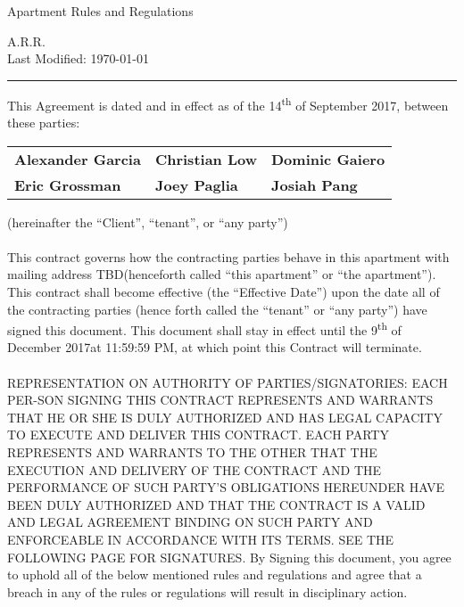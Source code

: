 \documentclass[10pt]{article}
\newcommand{\dateEffective}{14\textsuperscript {th} of September 2017}
\newcommand{\dateNullification}{9\textsuperscript {th} of December 2017}
\newcommand{\personOne}{Alexander Garcia}
\newcommand{\personTwo}{Christian Low}
\newcommand{\personThree}{Dominic Gaiero}
\newcommand{\personFour}{Eric Grossman}
\newcommand{\personFive}{Joey Paglia}
\newcommand{\personSix}{Josiah Pang}
\newcommand{\mailingAddress}{TBD}
\begin{document}
	\begin{center}
		{\Large Apartment Rules and Regulations}
	\end{center}
\begin{center}
	
	{\normalsize  A.R.R.}\\
	Last Modified: \today
\end{center}
\hrule height .1mm

\vspace{.5cm}
\noindent This Agreement is dated and in effect as of the \dateEffective, between these parties:\\

\begin{center}

\begin{tabu} to 0.8\textwidth {  X[c]  X[c]  X[c]  }
	{\bf \personOne} & {\bf \personTwo} & {\bf \personThree}\\
	{\bf {\bf \personFour}} & {\bf \personFive} & {\bf \personSix}\\
\end{tabu}


\end{center}
\noindent (hereinafter the ``Client'', ``tenant'', or ``any party'')\\ \\
\newpage
\noindent This contract governs how the contracting parties behave in this apartment with mailing address \mailingAddress (henceforth called ``this apartment'' or ``the apartment''). This contract shall become effective (the ``Effective Date'') upon the date all of the contracting parties (hence forth called the ``tenant'' or ``any party'') have signed this document. This document shall stay in effect until the \dateNullification\space at 11:59:59 PM, at which point this Contract will terminate.
\\ \\
\noindent REPRESENTATION ON AUTHORITY OF PARTIES/SIGNATORIES: EACH PER-SON SIGNING THIS CONTRACT REPRESENTS AND WARRANTS THAT HE OR SHE IS DULY AUTHORIZED AND HAS LEGAL CAPACITY TO EXECUTE AND DELIVER THIS CONTRACT. EACH PARTY REPRESENTS AND WARRANTS TO THE OTHER THAT THE EXECUTION AND DELIVERY OF THE CONTRACT AND THE PERFORMANCE OF SUCH PARTY’S OBLIGATIONS HEREUNDER HAVE BEEN DULY AUTHORIZED AND THAT THE CONTRACT IS A VALID AND LEGAL AGREEMENT BINDING ON SUCH PARTY AND ENFORCEABLE IN ACCORDANCE WITH ITS TERMS. SEE THE FOLLOWING PAGE FOR SIGNATURES.
\noindent \newline\newline By Signing this document, you agree to uphold all of the below mentioned rules and regulations and agree that a breach in any of the rules or regulations will result in disciplinary action.
\def\s#1#2{\vbox{\hsize=4.5cm
		\kern2cm
		\hrule\kern1ex
		\hbox to \hsize{\strut\hfil #1 \hfil}
		\hbox to \hsize{\strut\hfil #2 \hfil}}}
\end{document}
